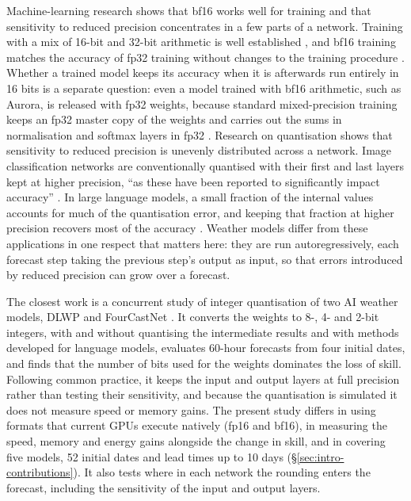 Machine-learning research shows that bf16 works well for training and
that sensitivity to reduced precision concentrates in a few parts of a
network. Training with a mix of 16-bit and 32-bit
arithmetic is well established \citep{micikevicius2018mixed}, and bf16
training matches the accuracy of fp32 training without changes to the
training procedure \citep{kalamkar2019bfloat16}. Whether a trained model
keeps its accuracy when it is afterwards run entirely in 16 bits is a
separate question: even a model trained with bf16 arithmetic, such as
Aurora, is released with fp32 weights, because standard
mixed-precision training keeps an fp32 master copy of the weights and
carries out the sums in normalisation and softmax layers in fp32
\citep{micikevicius2018mixed}. Research on quantisation shows that sensitivity to
reduced precision is unevenly distributed across a network. Image
classification networks are conventionally quantised with their first
and last layers kept at higher precision, ``as these have been reported
to significantly impact accuracy'' \citep{choi2018pact}. In large language
models, a small fraction of the internal values accounts for much of the
quantisation error, and keeping that fraction at higher precision recovers
most of the accuracy \citep{dettmers2022llmint8}. Weather models differ from these applications in one
respect that matters here: they are run autoregressively, each forecast
step taking the previous step's output as input, so that errors
introduced by reduced precision can grow over a forecast.

 The
closest work is a concurrent study of integer quantisation of two AI
weather models, DLWP and FourCastNet \citep{bhattacharya2026ptq}. It
converts the weights to 8-, 4- and 2-bit integers, with and without
quantising the intermediate results and with methods developed for
language models, evaluates 60-hour forecasts from four initial dates,
and finds that the number of bits used for the weights dominates the
loss of skill. Following common practice, it keeps the input and output
layers at full precision rather than testing their sensitivity, and
because the quantisation is simulated it does not measure speed or
memory gains. The present study differs in using formats that
current GPUs execute natively (fp16 and bf16), in measuring the speed,
memory and energy gains alongside the change in skill, and in covering
five models, 52 initial dates and lead times up to 10 days
(\S\ref{sec:intro-contributions}). It also tests where in each network
the rounding enters the forecast, including the sensitivity of the input
and output layers.

